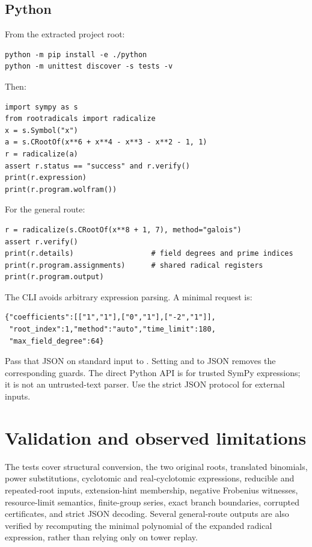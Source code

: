 \documentclass[11pt,letterpaper]{article}
\theoremstyle{definition}\newtheorem{definition}[theorem]{Definition}
\theoremstyle{remark}\newtheorem{remark}[theorem]{Remark}
\begin{document}
\subsection{Python}
From the extracted project root:
\begin{lstlisting}
python -m pip install -e ./python
python -m unittest discover -s tests -v
\end{lstlisting}
Then:
\begin{lstlisting}
import sympy as s
from rootradicals import radicalize
x = s.Symbol("x")
a = s.CRootOf(x**6 + x**4 - x**3 - x**2 - 1, 1)
r = radicalize(a)
assert r.status == "success" and r.verify()
print(r.expression)
print(r.program.wolfram())
\end{lstlisting}
For the general route:
\begin{lstlisting}
r = radicalize(s.CRootOf(x**8 + 1, 7), method="galois")
assert r.verify()
print(r.details)                  # field degrees and prime indices
print(r.program.assignments)      # shared radical registers
print(r.program.output)
\end{lstlisting}
The CLI avoids arbitrary expression parsing. A minimal request is:
\begin{lstlisting}
{"coefficients":[["1","1"],["0","1"],["-2","1"]],
 "root_index":1,"method":"auto","time_limit":180,
 "max_field_degree":64}
\end{lstlisting}
Pass that JSON on standard input to . Setting
 and  to JSON  removes the
corresponding guards. The direct Python API is for trusted SymPy expressions;
it is not an untrusted-text parser. Use the strict JSON protocol for external
inputs.

\section{Validation and observed limitations}
\label{sec:validation}

The tests cover structural conversion, the two original roots, translated
binomials, power substitutions, cyclotomic and real-cyclotomic expressions,
reducible and repeated-root inputs, extension-hint membership, negative
Frobenius witnesses, resource-limit semantics, finite-group series, exact
branch boundaries, corrupted certificates, and strict JSON decoding.
Several general-route outputs are also verified by recomputing the minimal
polynomial of the expanded radical expression, rather than relying only on
tower replay.
\end{document}

